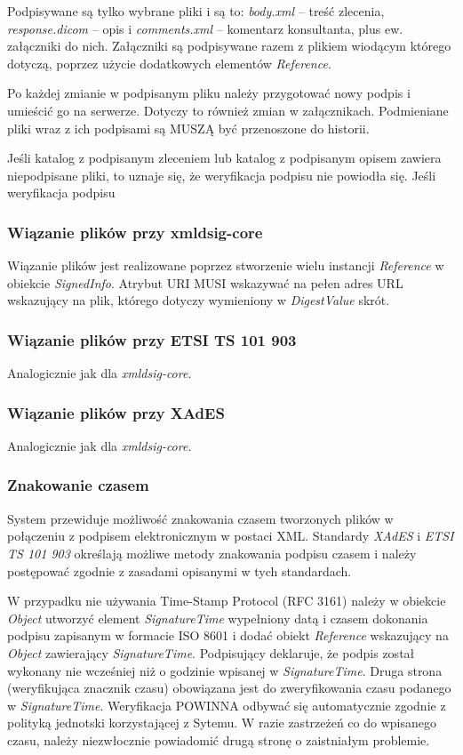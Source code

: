 \documentclass[a4paper]{article}
\begin{document}
Podpisywane są tylko wybrane pliki i są to: \emph{body.xml} -- treść zlecenia,
\emph{response.dicom} -- opis i \emph{comments.xml} -- komentarz konsultanta, plus ew.
załączniki do nich. Załączniki są podpisywane razem z plikiem wiodącym którego dotyczą,
poprzez użycie dodatkowych elementów \emph{Reference}.

Po każdej zmianie w podpisanym pliku należy przygotować nowy podpis i umieścić go na
serwerze. Dotyczy to również zmian w załącznikach. Podmieniane pliki wraz z ich podpisami
są MUSZĄ być przenoszone do historii.

Jeśli katalog z podpisanym zleceniem lub katalog z podpisanym opisem zawiera niepodpisane
pliki, to uznaje się, że weryfikacja podpisu nie powiodła się. Jeśli weryfikacja podpisu 

\subsubsection{Wiązanie plików przy xmldsig-core}

Wiązanie plików jest realizowane poprzez stworzenie wielu instancji \emph{Reference} w
obiekcie \emph{SignedInfo}. Atrybut URI MUSI wskazywać na pełen adres URL wskazujący
na plik, którego dotyczy wymieniony w \emph{DigestValue} skrót.

\subsubsection{Wiązanie plików przy ETSI TS 101 903}

Analogicznie jak dla \emph{xmldsig-core}.

\subsubsection{Wiązanie plików przy XAdES}

Analogicznie jak dla \emph{xmldsig-core}.

\subsubsection{Znakowanie czasem}

System przewiduje możliwość znakowania czasem tworzonych plików w połączeniu z podpisem
elektronicznym w postaci XML. Standardy \textit{XAdES} i \textit{ETSI TS 101 903}
określają możliwe metody znakowania podpisu czasem i należy postępować zgodnie z zasadami
opisanymi w tych standardach. 

W przypadku nie używania Time-Stamp Protocol (RFC 3161) należy w obiekcie \emph{Object}
utworzyć element \emph{SignatureTime} wypełniony datą i czasem dokonania podpisu zapisanym w
formacie ISO 8601 i dodać obiekt \emph{Reference} wskazujący na \emph{Object} zawierający
\emph{SignatureTime}. Podpisujący deklaruje, że podpis został wykonany nie wcześniej niż o
godzinie wpisanej w \emph{SignatureTime}. Druga strona (weryfikująca znacznik czasu)
obowiązana jest do zweryfikowania czasu podanego w \emph{SignatureTime}. Weryfikacja
POWINNA odbywać się automatycznie zgodnie z polityką jednotski korzystającej z Sytemu. W
razie zastrzeżeń co do wpisanego czasu, należy niezwłocznie powiadomić drugą stronę o
zaistniałym problemie.
\end{document}
